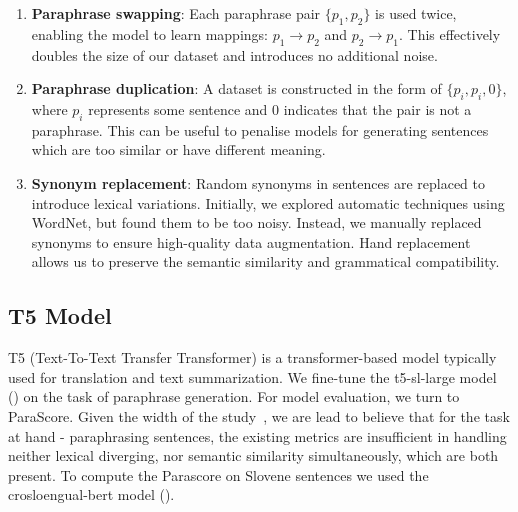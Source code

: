 \documentclass[fleqn,moreauthors,10pt]{ds_report}
\begin{document}
\begin{enumerate}
    \item \textbf{Paraphrase swapping}: Each paraphrase pair $\{p_1, p_2\}$ is used twice, enabling the model to learn mappings: $p_1 \rightarrow p_2$ and $p_2 \rightarrow p_1$. This effectively doubles the size of our dataset and introduces no additional noise.
    \item \textbf{Paraphrase duplication}: A dataset is constructed in the form of $\{p_i, p_i, 0\}$, where $p_i$ represents some sentence and $0$ indicates that the pair is not a paraphrase. This can be useful to penalise models for generating sentences which are too similar or have different meaning.
    \item \textbf{Synonym replacement}: Random synonyms in sentences are replaced to introduce lexical variations. Initially, we explored automatic techniques using WordNet, but found them to be too noisy. Instead, we manually replaced synonyms to ensure high-quality data augmentation. Hand replacement allows us to preserve the semantic similarity and grammatical compatibility. 
    

\end{enumerate}


\subsection{T5 Model}

T5 (Text-To-Text Transfer Transformer) is a transformer-based model typically used for translation and text summarization. We fine-tune the t5-sl-large model (\cite{ulvcar2022sequence}) on the task of paraphrase generation. For model evaluation, we turn to ParaScore. Given the width of the study~\cite{evaluation-metrics-in-paraphrase-generation}, we are lead to believe that for the task at hand - paraphrasing sentences, the existing metrics are insufficient in handling neither lexical diverging, nor semantic similarity simultaneously, which are both present. To compute the Parascore on Slovene sentences we used the crosloengual-bert model (\cite{ulcar-robnik2020finest}).
\end{document}
